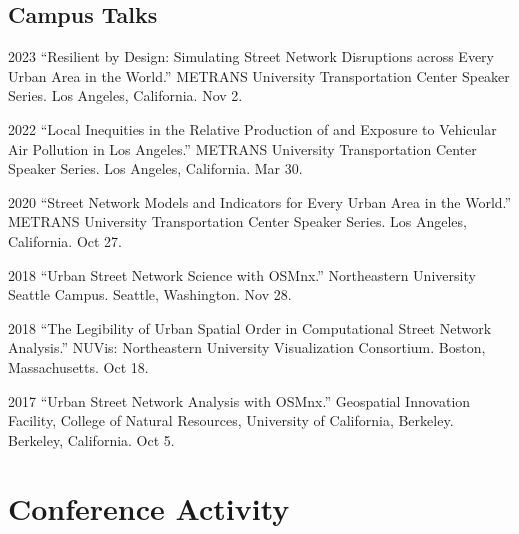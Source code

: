 \documentclass[11pt,letterpaper]{report}
\begin{document}
    \subsection*{Campus Talks}

    \begin{tablist}


        \item[2023] \tab{}\enquote{Resilient by Design: Simulating Street Network Disruptions across Every Urban Area in the World.} METRANS University Transportation Center Speaker Series. Los Angeles, California. Nov 2.

        \item[2022] \tab{}\enquote{Local Inequities in the Relative Production of and Exposure to Vehicular Air Pollution in Los Angeles.} METRANS University Transportation Center Speaker Series. Los Angeles, California. Mar 30.

        \item[2020] \tab{}\enquote{Street Network Models and Indicators for Every Urban Area in the World.} METRANS University Transportation Center Speaker Series. Los Angeles, California. Oct 27.

        \item[2018] \tab{}\enquote{Urban Street Network Science with OSMnx.} Northeastern University Seattle Campus. Seattle, Washington. Nov 28.

        \item[2018] \tab{}\enquote{The Legibility of Urban Spatial Order in Computational Street Network Analysis.} NUVis: Northeastern University Visualization Consortium. Boston, Massachusetts. Oct 18.

        \item[2017] \tab{}\enquote{Urban Street Network Analysis with OSMnx.} Geospatial Innovation Facility, College of Natural Resources, University of California, Berkeley. Berkeley, California. Oct 5.

    \end{tablist}



    \section*{Conference Activity}
\end{document}
